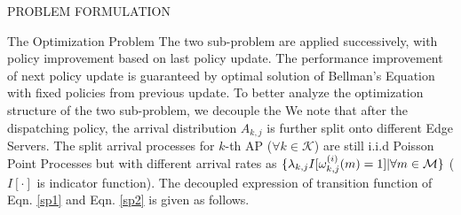 \documentclass[10pt, conference, letterpaper]{IEEEtran}
\DeclarePairedDelimiter{\set}{\{}{\}}
\newcommand{\apSet}{\mathcal{K}}
\newcommand{\esSet}{\mathcal{M}}
\begin{document}
\begin{section}{PROBLEM FORMULATION}
\begin{subsection}{The Optimization Problem}
            The two sub-problem are applied successively, with policy improvement based on last policy update. The performance improvement of next policy update is guaranteed by optimal solution of Bellman's Equation with fixed policies from previous update.
            To better analyze the optimization structure of the two sub-problem, we decouple the 
            We note that after the dispatching policy, the arrival distribution $A_{k,j}$ is further split onto different Edge Servers. The split arrival processes for $k$-th AP ($\forall k\in\apSet$) are still i.i.d Poisson Point Processes but with different arrival rates as $\set{\lambda_{k,j}I[\omega^{(i)}_{k,j}(m)=1]|\forall m\in\esSet}$ ($I[\cdot]$ is indicator function). The decoupled expression of transition function of Eqn. \ref{sp1} and Eqn. \ref{sp2} is given as follows.
            

\end{subsection}
\end{section}
\end{document}
